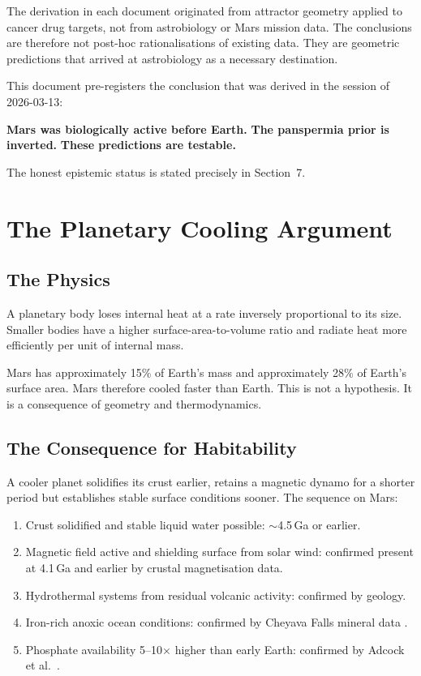 \documentclass[11pt, a4paper]{article}
\begin{document}
The derivation in each document originated from
attractor geometry applied to cancer drug targets,
not from astrobiology or Mars mission data.
The conclusions are therefore not post-hoc
rationalisations of existing data.
They are geometric predictions that arrived at
astrobiology as a necessary destination.

This document pre-registers the conclusion that
was derived in the session of 2026-03-13:

\textbf{Mars was biologically active before Earth.}
\textbf{The panspermia prior is inverted.}
\textbf{These predictions are testable.}

The honest epistemic status is stated precisely
in Section~7.

\section{The Planetary Cooling Argument}

\subsection{The Physics}

A planetary body loses internal heat at a rate
inversely proportional to its size.
Smaller bodies have a higher surface-area-to-volume
ratio and radiate heat more efficiently per unit
of internal mass.

Mars has approximately 15\% of Earth's mass and
approximately 28\% of Earth's surface area.
Mars therefore cooled faster than Earth.
This is not a hypothesis.
It is a consequence of geometry and thermodynamics.

\subsection{The Consequence for Habitability}

A cooler planet solidifies its crust earlier,
retains a magnetic dynamo for a shorter period
but establishes stable surface conditions sooner.
The sequence on Mars:

\begin{enumerate}[leftmargin=*, label=(\arabic*)]
\item Crust solidified and stable liquid water
  possible: $\sim$4.5\,Ga or earlier.
\item Magnetic field active and shielding
  surface from solar wind: confirmed present
  at 4.1\,Ga and earlier by crustal
  magnetisation data.
\item Hydrothermal systems from residual
  volcanic activity: confirmed by geology.
\item Iron-rich anoxic ocean conditions:
  confirmed by Cheyava Falls mineral data
  \cite{hurowitz2025}.
\item Phosphate availability 5--10$\times$ higher
  than early Earth: confirmed by Adcock et al.\
  \cite{adcock2013}.
\end{enumerate}
\end{document}
